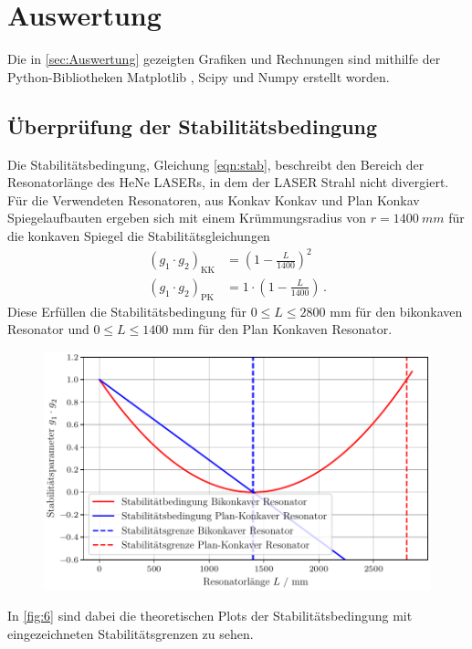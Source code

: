 \section{Auswertung}
\label{sec:Auswertung}
Die in \autoref{sec:Auswertung} gezeigten Grafiken und Rechnungen sind mithilfe der Python-Bibliotheken Matplotlib \cite{matplotlib}, Scipy \cite{scipy} und Numpy \cite{numpy}
erstellt worden.


\subsection{Überprüfung der Stabilitätsbedingung}
\label{sec:a1}
Die Stabilitätsbedingung, Gleichung \autoref{eqn:stab}, beschreibt den Bereich der Resonatorlänge des HeNe LASERs, in dem der LASER Strahl nicht divergiert. 
Für die Verwendeten Resonatoren, aus Konkav Konkav und Plan Konkav Spiegelaufbauten ergeben sich mit einem Krümmungsradius von $r = \SI{1400}{mm}$ für die konkaven Spiegel die Stabilitätsgleichungen
\begin{align}
  \left(g_1 \cdot g_2\right)_{\text{KK}} &= \left( 1 - \frac{L}{1400} \right)^2 \\
  \left(g_1 \cdot g_2\right)_{\text{PK}} &= 1 \cdot \left( 1 - \frac{L}{1400} \right) \, .
\end{align}
Diese Erfüllen die Stabilitätsbedingung für $0 \leq L \leq 2800 \, \, \mathrm{mm}$ für den bikonkaven Resonator und $0 \leq L \leq 1400 \, \, \mathrm{mm}$ für den Plan Konkaven Resonator.
\begin{figure}[H]
  \centering
  \includegraphics[width=\linewidth]{plots/stab_theo.pdf}
  \caption{}
  \label{fig:6}
\end{figure}
In \autoref{fig:6} sind dabei die theoretischen Plots der Stabilitätsbedingung mit eingezeichneten Stabilitätsgrenzen zu sehen. 
